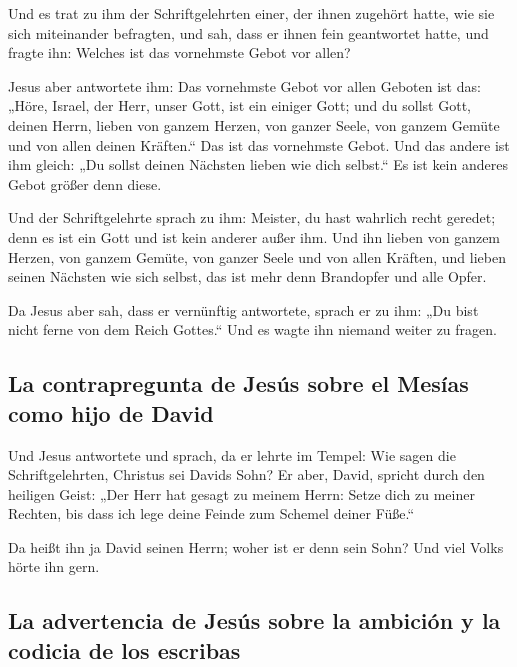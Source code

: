  Und es trat zu ihm der Schriftgelehrten einer, der ihnen
zugehört hatte, wie sie sich miteinander befragten, und sah, dass er
ihnen fein geantwortet hatte, und fragte ihn: Welches ist das vornehmste
Gebot vor allen?

 Jesus aber antwortete ihm: Das vornehmste Gebot vor
allen Geboten ist das: „Höre, Israel, der Herr, unser Gott, ist ein
einiger Gott;  und du sollst Gott, deinen Herrn, lieben
von ganzem Herzen, von ganzer Seele, von ganzem Gemüte und von allen
deinen Kräften.`` Das ist das vornehmste Gebot.  Und das
andere ist ihm gleich: „Du sollst deinen Nächsten lieben wie dich
selbst.`` Es ist kein anderes Gebot größer denn diese.

 Und der Schriftgelehrte sprach zu ihm: Meister, du hast
wahrlich recht geredet; denn es ist ein Gott und ist kein anderer außer
ihm.  Und ihn lieben von ganzem Herzen, von ganzem
Gemüte, von ganzer Seele und von allen Kräften, und lieben seinen
Nächsten wie sich selbst, das ist mehr denn Brandopfer und alle Opfer.

 Da Jesus aber sah, dass er vernünftig antwortete, sprach
er zu ihm: „Du bist nicht ferne von dem Reich Gottes.`` Und es wagte ihn
niemand weiter zu fragen.

\hypertarget{la-contrapregunta-de-jesuxfas-sobre-el-mesuxedas-como-hijo-de-david}{%
\subsection{La contrapregunta de Jesús sobre el Mesías como hijo de
David}\label{la-contrapregunta-de-jesuxfas-sobre-el-mesuxedas-como-hijo-de-david}}

 Und Jesus antwortete und sprach, da er lehrte im Tempel:
Wie sagen die Schriftgelehrten, Christus sei Davids Sohn?
 Er aber, David, spricht durch den heiligen Geist: „Der
Herr hat gesagt zu meinem Herrn: Setze dich zu meiner Rechten, bis dass
ich lege deine Feinde zum Schemel deiner Füße.``

 Da heißt ihn ja David seinen Herrn; woher ist er denn
sein Sohn? Und viel Volks hörte ihn gern.

\hypertarget{la-advertencia-de-jesuxfas-sobre-la-ambiciuxf3n-y-la-codicia-de-los-escribas}{%
\subsection{La advertencia de Jesús sobre la ambición y la codicia de
los
escribas}\label{la-advertencia-de-jesuxfas-sobre-la-ambiciuxf3n-y-la-codicia-de-los-escribas}}

